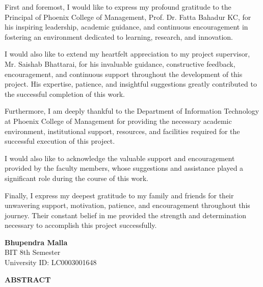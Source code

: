 \documentclass[12pt,a4paper]{report}
\begin{document}
First and foremost, I would like to express my profound gratitude to the Principal of Phoenix College of Management, Prof. Dr. Fatta Bahadur KC, for his inspiring leadership, academic guidance, and continuous encouragement in fostering an environment dedicated to learning, research, and innovation.

I would also like to extend my heartfelt appreciation to my project supervisor, Mr. Saishab Bhattarai, for his invaluable guidance, constructive feedback, encouragement, and continuous support throughout the development of this project. His expertise, patience, and insightful suggestions greatly contributed to the successful completion of this work.

Furthermore, I am deeply thankful to the Department of Information Technology at Phoenix College of Management for providing the necessary academic environment, institutional support, resources, and facilities required for the successful execution of this project.

I would also like to acknowledge the valuable support and encouragement provided by the faculty members, whose suggestions and assistance played a significant role during the course of this work.

Finally, I express my deepest gratitude to my family and friends for their unwavering support, motivation, patience, and encouragement throughout this journey. Their constant belief in me provided the strength and determination necessary to accomplish this project successfully.

\vspace{1cm}
\noindent
\textbf{Bhupendra Malla}\\
BIT 8th Semester\\
University ID: LC0003001648

\clearpage

\begin{center}\textbf{\fontsize{16}{19}\selectfont ABSTRACT}\end{center}
\vspace{0.6cm}
\end{document}
